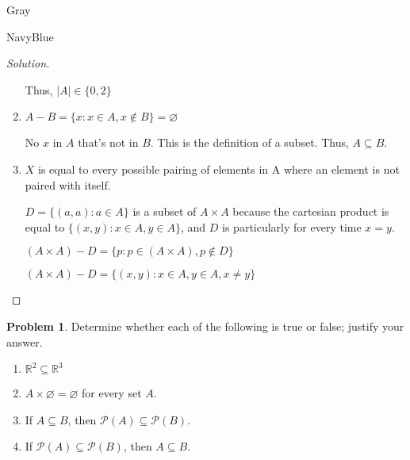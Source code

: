 \documentclass[12pt]{amsart}
\newcounter{problem_number}[section]
\theoremstyle{named}
\newenvironment{soln}
{\begin{color}{Gray}\begin{framed}\begin{color}{NavyBlue}\begin{proof}[Solution]
\doublespacing}
{\end{proof}\end{color}\end{framed}\end{color}}
\theoremstyle{definition}
\newtheorem{problem}{Problem}
\newcommand{\R}{\mathbb R}
\begin{document}
\begin{soln}
\begin{enumerate}
        \noindent Thus, $|A| \in \{0,2\}$

        \phantom{ }

        \item $ A - B = \{x : x \in A, x \notin B\} = \varnothing$
        
        \noindent No $x$ in $A$ that's not in $B$. This is the definition of a
        subset. Thus, $A \subseteq B$. 

        \item $X$ is equal to every possible pairing of elements in A where an
        element is not paired with itself. 
        
        \noindent $D = \{(a,a) : a \in A\}$ is a subset of $A \times A$
        because the cartesian product is equal to $\{(x,y) : x \in A, y \in A\}$,
        and $D$ is particularly for every time $x = y$. 
        
        \noindent$(A \times A) - D = \{p : p \in (A \times A), p \notin D\}$

        \noindent$(A \times A) - D = \{(x,y) : x \in A, y \in A, x \neq y\}$
    \end{enumerate}
\end{soln}
\begin{problem}
	Determine whether each of the following is true or false; justify your answer.
	\begin{enumerate}
		\item $\R^2\subseteq\R^3$
		\item $A\times\varnothing = \varnothing$ for every set $A$.
		\item If $A\subseteq B$, then $\mathscr P(A)\subseteq\mathscr P(B)$.	
		\item If $\mathscr P(A)\subseteq\mathscr P(B)$, then $A\subseteq B$. 
	\end{enumerate}
	
\end{problem}
\end{document}
